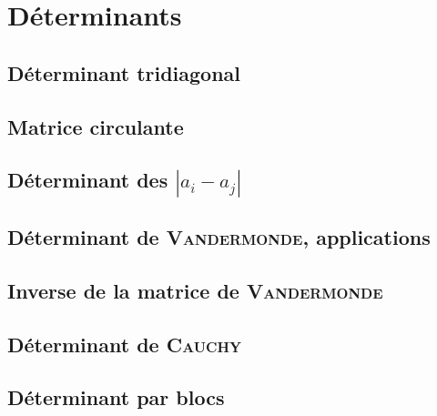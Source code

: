 \chapter{Déterminants}



\newpage

\section{Déterminant tridiagonal}


\section{Matrice circulante}


\section{Déterminant des \texorpdfstring{$|a_i - a_j|$}{|a_i - a_j|}}


\section{Déterminant de \textsc{Vandermonde}, applications}


\section{Inverse de la matrice de {\textsc{Vandermonde}}}


\section{Déterminant de \textsc{Cauchy}}


\section{Déterminant par blocs}
